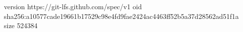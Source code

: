 version https://git-lfs.github.com/spec/v1
oid sha256:a10577cade19661b17529c98e4fd9fae2424ac4463ff52b5a37d28562ad51f1a
size 524384
